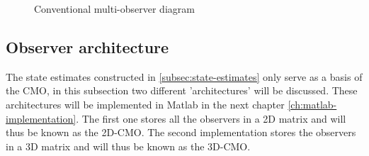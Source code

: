 \begin{figure}[H]
    \caption{Conventional multi-observer diagram}
    \label{fig:cmo-diagram}
\end{figure}

\subsection{Observer architecture}\label{subsec:CMO-architecture}
The state estimates constructed in \ref{subsec:state-estimates} only serve as a basis of the CMO, in this subsection two different 'architectures' will be discussed. These architectures will be implemented in Matlab in the next chapter \ref{ch:matlab-implementation}. The first one  stores all the observers in a 2D matrix and will thus be known as the 2D-CMO. The second implementation stores the observers in a 3D matrix and will thus be known as the 3D-CMO.

